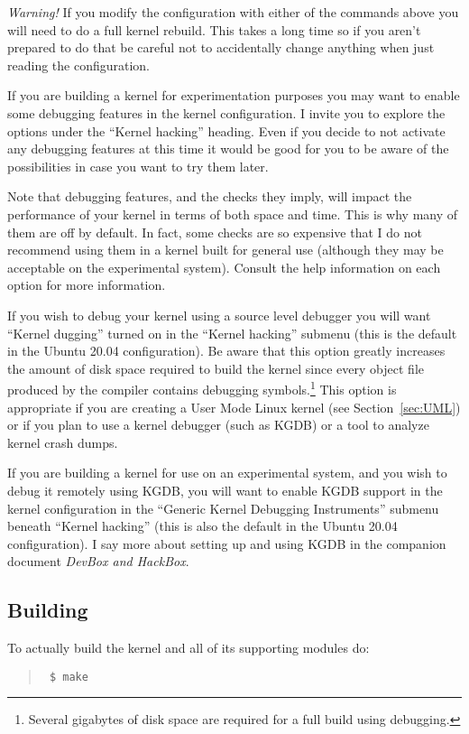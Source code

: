 \documentclass{article}
\newenvironment{commands}
  {\begin{quote} \tt}
  {\end{quote}}
\begin{document}
\textit{Warning!} If you modify the configuration with either of the commands above you will
need to do a full kernel rebuild. This takes a long time so if you aren't prepared to do that be
careful not to accidentally change anything when just reading the configuration.

If you are building a kernel for experimentation purposes you may want to enable some debugging
features in the kernel configuration. I invite you to explore the options under the ``Kernel
hacking'' heading. Even if you decide to not activate any debugging features at this time it
would be good for you to be aware of the possibilities in case you want to try them later.

Note that debugging features, and the checks they imply, will impact the performance of your
kernel in terms of both space and time. This is why many of them are off by default. In fact,
some checks are so expensive that I do not recommend using them in a kernel built for general
use (although they may be acceptable on the experimental system). Consult the help information
on each option for more information.

If you wish to debug your kernel using a source level debugger you will want ``Kernel dugging''
turned on in the ``Kernel hacking'' submenu (this is the default in the Ubuntu 20.04
configuration). Be aware that this option greatly increases the amount of disk space required to
build the kernel since every object file produced by the compiler contains debugging
symbols.\footnote{Several gigabytes of disk space are required for a full build using
  debugging.} This option is appropriate if you are creating a User Mode Linux kernel (see
Section~\ref{sec:UML}) or if you plan to use a kernel debugger (such as KGDB) or a tool to
analyze kernel crash dumps.

If you are building a kernel for use on an experimental system, and you wish to debug it
remotely using KGDB, you will want to enable KGDB support in the kernel configuration in the
``Generic Kernel Debugging Instruments'' submenu beneath ``Kernel hacking'' (this is also the
default in the Ubuntu 20.04 configuration). I say more about setting up and using KGDB in the
companion document \textit{DevBox and HackBox}.

\subsection{Building}
\label{sec:building}

To actually build the kernel and all of its supporting modules do:
\begin{commands}
\$ make
\end{commands}
\end{document}
